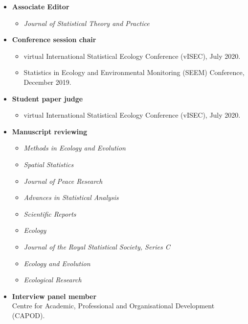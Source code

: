 \documentclass[10pt,a4paper]{moderncv}
\begin{document}
\begin{itemize}
\item \textbf{Associate Editor}
  \begin{itemize}
  \item \textit{Journal of Statistical Theory and Practice}
  \end{itemize}
\item \textbf{Conference session chair}
  \begin{itemize}
  \item virtual International Statistical Ecology Conference (vISEC), July 2020.
  \item Statistics in Ecology and Environmental Monitoring (SEEM) Conference, December 2019.
  \end{itemize}
  \item \textbf{Student paper judge}
  \begin{itemize}
  \item virtual International Statistical Ecology Conference (vISEC), July 2020.
  \end{itemize}
\item \textbf{Manuscript reviewing}
  \begin{itemize}
  \item \textit{Methods in Ecology and Evolution}
  \item \textit{Spatial Statistics}
  \item \textit{Journal of Peace Research}
  \item \textit{Advances in Statistical Analysis}
  \item   \textit{Scientific Reports}
  \item \textit{Ecology}
  \item  \textit{Journal of the Royal Statistical Society, Series C}
  \item   \textit{Ecology and Evolution}
  \item   \textit{Ecological Research}
  \end{itemize}
  \item \textbf{Interview panel member}\\
    Centre for Academic, Professional and Organisational Development (CAPOD).
  \end{itemize}




\end{document}
